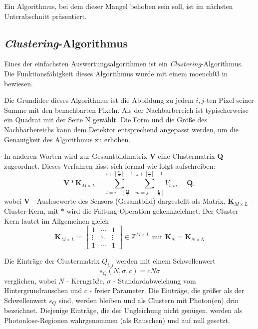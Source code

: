 \noindent
Ein Algorithmus, bei dem dieser Mangel behoben sein soll, ist im nächsten Unterabschnitt präsentiert.

\subsection{\emph{Clustering}-Algorithmus}
\label{text:clustering_algorithm}
Eines der einfachsten Auswertungsalgorithmen ist ein \emph{Clustering}-Algorithmus. Die Funktionsfähigkeit dieses Algorithmus wurde mit einem \gls{moench03} in \cite{cartier_micron_2014} bewiesen.

\noindent
Die Grundidee dieses Algorithmus ist die Abbildung zu jedem $i,j$-ten Pixel seiner Summe mit den benachbarten Pixeln. Als der Nachbarbereich ist typischerweise ein Quadrat mit der Seite N gewählt. Die Form und die Größe des Nachbarbereichs kann dem Detektor entsprechend angepasst werden, um die Genauigkeit des Algorithmus zu erhöhen.

\noindent
In anderen Worten wird zur Gesamtbildmatrix $\mathbf{V}$ eine Clustermatrix $\mathbf{Q}$ zugeordnet. Dieses Verfahren lässt sich formal wie folgt aufschreiben:
\begin{equation}
    \mathbf{V} * \mathbf{K}_{M\times L} = \sum_{l=i-\left[\frac{\text{M}}{2}\right]}^{i+\left[\frac{\text{M}}{2}\right]-1} \sum_{m=j-\left[\frac{\text{L}}{2}\right]}^{j+\left[\frac{\text{L}}{2}\right]-1} V_{l,m} = \mathbf{Q},
\end{equation}
wobei $\mathbf{V}$ - Auslesewerte des Sensors (Gesamtbild) dargestellt als Matrix, $\mathbf{K}_{M \times L}$ - Cluster-Kern, mit $*$ wird die Faltung-Operation gekennzeichnet. Der Cluster-Kern lautet im Allgemeinen gleich
\begin{equation}
    \mathbf{K}_{M \times L}  = \begin{bmatrix}
1 & \cdots & 1\\
\vdots & \ddots & \vdots\\
1 & \cdots & 1
\end{bmatrix}
\in \mathbb{Z}^{M \times L} \text{ mit } \mathbf{K}_N = \mathbf{K}_{N \times N}
\end{equation}

\noindent
Die Einträge der Clustermatrix $Q_{i,j}$ werden mit einem Schwellenwert 
\begin{equation}
    s_Q(N, \sigma, c) = cN\sigma
\end{equation}
verglichen, wobei $N$ - Kerngröße, $\sigma$ - Standardabweichung vom Hintergrundrauschen und $c$ - freier Parameter. Die Einträge, die größer als der Schwellenwert $s_Q$ sind, werden bleiben und als Clustern mit Photon(en) drin bezeichnet. Diejenige Einträge, die der Ungleichung nicht genügen, werden als Photonlose-Regionen wahrgenommen (als Rauschen) und auf null gesetzt.

